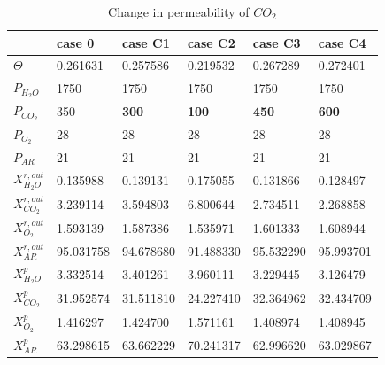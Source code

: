 \begin{table}[H]
\centering
\caption{Change in permeability of $CO_2$}
\label{tab:table4}
\begin{tabular}{|l|l|l|l|l|l|}
\hline
                    & case 0    & case C1   & case C2   & case C3  & case C4 \\ \hline
$\Theta$            & 0.261631  & 0.257586  & 0.219532  & 0.267289 & 0.272401\\ \hline
$P_{H_2O}$          & 1750      & 1750      & 1750      & 1750     & 1750    \\ \hline
$P_{CO_2}$          & 350       & \textbf{300}          & \textbf{100}     &\textbf{450} & \textbf{600}      \\ \hline
$P_{O_2}$           & 28        & 28        & 28        & 28        & 28   \\ \hline
$P_{AR}$            & 21        & 21        & 21        & 21        & 21   \\ \hline \hline
$X^{r,out}_{H_2O}$  & 0.135988  & 0.139131  & 0.175055  & 0.131866  & 0.128497   \\ \hline
$X^{r,out}_{CO_2}$  & 3.239114  & 3.594803  & 6.800644  & 2.734511  & 2.268858 \\ \hline
$X^{r,out}_{O_2}$   & 1.593139  & 1.587386  & 1.535971  & 1.601333  & 1.608944 \\ \hline
$X^{r,out}_{AR}$    & 95.031758 & 94.678680 & 91.488330 & 95.532290 & 95.993701\\ \hline
$X^{p}_{H_2O}$      & 3.332514  & 3.401261  & 3.960111  & 3.229445  & 3.126479 \\ \hline
$X^{p}_{CO_2}$      & 31.952574 & 31.511810 & 24.227410 & 32.364962 & 32.434709\\ \hline
$X^{p}_{O_2}$       & 1.416297  & 1.424700  & 1.571161  &  1.408974 &  1.408945\\ \hline
$X^{p}_{AR}$        & 63.298615 & 63.662229 & 70.241317 &  62.996620& 63.029867\\ \hline
\end{tabular}
\end{table}

